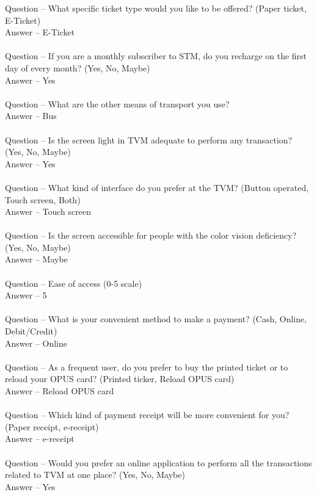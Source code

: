 \documentclass[a4paper, 11pt]{report}
\begin{document}
{Question – What specific ticket type would you like to be offered? (Paper ticket, E-Ticket)\\
Answer – E-Ticket\\\\
Question – If you are a monthly subscriber to STM, do you recharge on the first day of every month? (Yes, No, Maybe)\\
Answer – Yes\\\\
Question – What are the other means of transport you use? \\ 
Answer – Bus\\\\
Question – Is the screen light in TVM adequate to perform any transaction? (Yes, No, Maybe)\\
Answer – Yes\\\\
Question – What kind of interface do you prefer at the TVM? (Button operated, Touch screen, Both)\\
Answer – Touch screen\\\\
Question – Is the screen accessible for people with the color vision deficiency? (Yes, No, Maybe)\\
Answer – Maybe\\\\
Question – Ease of access (0-5 scale)\\
Answer – 5\\\\
Question – What is your convenient method to make a payment? (Cash, Online, Debit/Credit)\\
Answer – Online\\\\
Question – As a frequent user, do you prefer to buy the printed ticket or to reload your OPUS card? (Printed ticker, Reload OPUS card)\\
Answer – Reload OPUS card\\\\
Question – Which kind of payment receipt will be more convenient for you? (Paper receipt, e-receipt)\\
Answer – e-receipt\\\\
Question – Would you prefer an online application to perform all the transactions related to TVM at one place? (Yes, No, Maybe)\\
Answer – Yes\\\\
}
\end{document}
